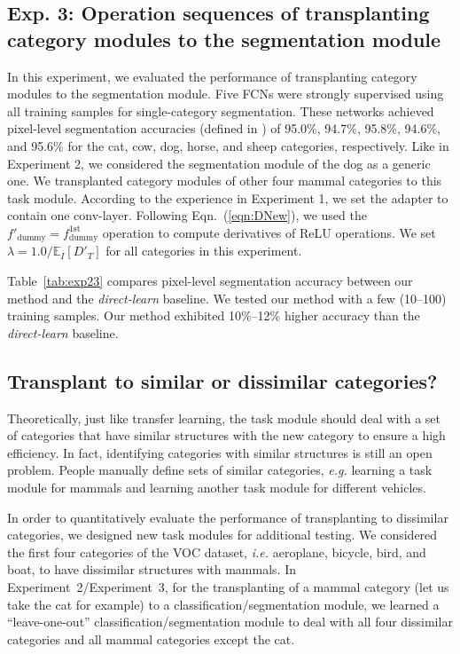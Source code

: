 \documentclass[10pt,twocolumn,letterpaper]{article}
\begin{document}
\subsection{Exp. 3: Operation sequences of transplanting category modules to the segmentation module}

In this experiment, we evaluated the performance of transplanting category modules to the segmentation module. Five FCNs were strongly supervised using all training samples for single-category segmentation. These networks achieved pixel-level segmentation accuracies (defined in \cite{VGGSeg}) of 95.0\%, 94.7\%, 95.8\%, 94.6\%, and 95.6\% for the cat, cow, dog, horse, and sheep categories, respectively. Like in Experiment 2, we considered the segmentation module of the dog\textcolor{red}{\footnotemark[5]} as a generic one. We transplanted category modules of other four mammal categories to this task module.
According to the experience in Experiment 1, we set the adapter to contain one conv-layer. Following Eqn.~(\ref{eqn:DNew}), we used the {\small$f'_{\textrm{dummy}}=f^{\textrm{1st}}_{\textrm{dummy}}$} operation to compute derivatives of ReLU operations\textcolor{red}{\footnotemark[3]}. We set {\small$\lambda=1.0/{\mathbb E}_{I}[D'_{T}]$} for all categories in this experiment.

Table~\ref{tab:exp23} compares pixel-level segmentation accuracy between our method and the \textit{direct-learn} baseline. We tested our method with a few (10--100) training samples. Our method exhibited 10\%--12\% higher accuracy than the \textit{direct-learn} baseline.

\subsection{Transplant to similar or dissimilar categories?}

Theoretically, just like transfer learning, the task module should deal with a set of categories that have similar structures with the new category to ensure a high efficiency. In fact, identifying categories with similar structures is still an open problem. People manually define sets of similar categories, \emph{e.g.} learning a task module for mammals and learning another task module for different vehicles.

In order to quantitatively evaluate the performance of transplanting to dissimilar categories, we designed new task modules for additional testing. We considered the first four categories of the VOC dataset, \emph{i.e.} aeroplane, bicycle, bird, and boat, to have dissimilar structures with mammals. In Experiment~2/Experiment~3, for the transplanting of a mammal category (let us take the cat for example) to a classification/segmentation module, we learned a ``leave-one-out'' classification/segmentation module to deal with all four dissimilar categories and all mammal categories except the cat.
\end{document}
